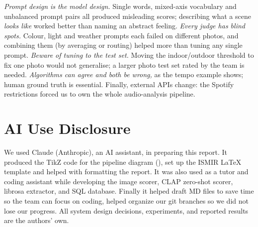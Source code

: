 \documentclass{article}
\begin{document}
\emph{Prompt design is the model design.} Single words, mixed-axis
vocabulary and unbalanced prompt pairs all produced misleading scores;
describing what a scene \emph{looks like} worked better than naming an
abstract feeling. \emph{Every judge has blind spots.} Colour, light and
weather prompts each failed on different photos, and combining them
(by averaging or routing) helped more than tuning any single prompt.
\emph{Beware of tuning to the test set.} Moving the indoor/outdoor threshold to
fix one photo would not generalise; a larger photo test set rated by the team
is needed. \emph{Algorithms can agree and both be wrong,} as the tempo example
shows; human ground truth is essential. Finally, external APIs change: the
Spotify restrictions forced us to own the whole audio-analysis pipeline.

\section{AI Use Disclosure}\label{sec:ai}

We used Claude (Anthropic), an AI assistant, in preparing this report. It
produced the TikZ code for the pipeline diagram (), set up
the ISMIR \LaTeX{} template and helped with formatting the report. It was also used 
as a tutor and coding assistant while developing the image scorer, CLAP zero-shot scorer, librosa extractor, and SQL database. Finally it helped draft MD 
files to save time so the team can focus on coding, helped organize our git branches so we 
did not lose our progress. All system design decisions, experiments, 
and reported results are the authors' own.


\end{document}

